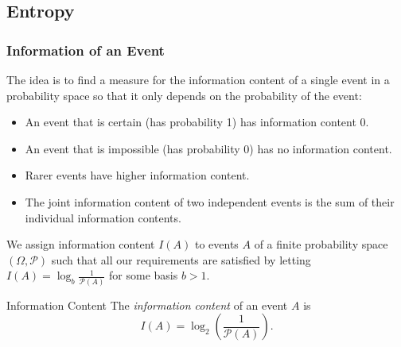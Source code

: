 \documentclass[english]{panikzettel}
\begin{document}
\subsection{Entropy}
\subsubsection{Information of an Event}
The idea is to find a measure for the information content of
a single event in a probability space so that it only depends on the probability of the event:

\begin{itemize}
\item An event that is certain (has probability 1) has information content 0.
\item An event that is impossible (has probability 0) has no information content.
\item Rarer events have higher information content.
\item The joint information content of two independent events is the sum of their individual information contents.
\end{itemize}



\begin{halfboxl}
\vspace{-\baselineskip}

We assign information content $I(A)$ to events $A$ of a finite probability space $(\Omega, \mathcal{P})$ such that all our requirements are satisfied by letting $I(A)=\log_b \frac{1}{\mathcal{P}(A)}$ for some basis $b > 1$.

\end{halfboxl}
\begin{halfboxr}
\vspace{-\baselineskip}

\begin{defi}{Information Content}
The \emph{information content} of an event $A$ is
\[
I(A)=\log_2 \left(\frac{1}{\mathcal{P}(A)}\right).
\]
\end{defi}

\end{halfboxr}
\end{document}
